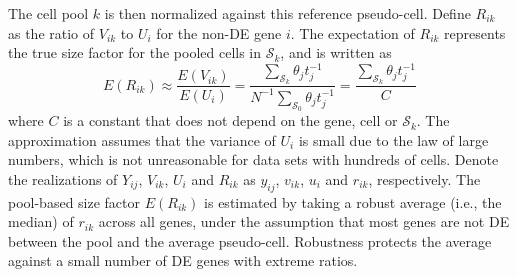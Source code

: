 \documentclass{bmcart}
\newcommand{\revised}[1]{#1}
\begin{document}
\revised{The cell pool $k$ is then normalized against this reference pseudo-cell.
Define $R_{ik}$ as the ratio of $V_{ik}$ to $U_{i}$ for the non-DE gene $i$.
The expectation of $R_{ik}$ represents the true size factor for the pooled cells in $\mathcal{S}_k$, and is written as 
\begin{equation}
    \revised{E(R_{ik}) \approx \frac{E(V_{ik})}{E(U_{i})} }
    = \frac{\sum_{\mathcal{S}_k} \theta_j t_j^{-1}}{ N^{-1} \sum_{\mathcal{S}_0} \theta_j t_j^{-1}} 
    = \frac{\sum_{\mathcal{S}_k} \theta_j t_j^{-1}}{C}
    \label{eqn:linear_single}
\end{equation}
where $C$ is a constant that does not depend on the gene, cell or $\mathcal{S}_k$.
The approximation assumes that the variance of $U_i$ is small due to the law of large numbers, which is not unreasonable for data sets with hundreds of cells.
Denote the realizations of $Y_{ij}$, $V_{ik}$, $U_{i}$ and $R_{ik}$ as $y_{ij}$, $v_{ik}$, $u_i$ and $r_{ik}$, respectively.
The pool-based size factor $E(R_{ik})$ is estimated by taking a robust average (i.e., the median) of $r_{ik}$ across all genes, under the assumption that most genes are not DE between the pool and the average pseudo-cell.
Robustness protects the average against a small number of DE genes with extreme ratios.}

%
\end{document}

